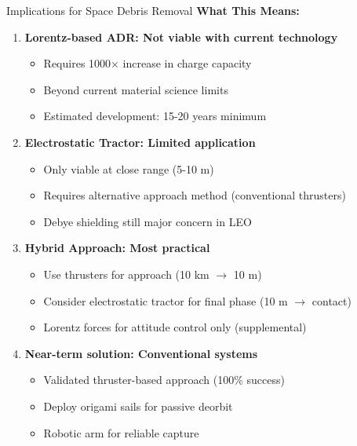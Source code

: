 \documentclass[aspectratio=169]{beamer}
\begin{document}
\begin{frame}{Implications for Space Debris Removal}
\textbf{What This Means:}

\begin{enumerate}
    \item \textbf{Lorentz-based ADR: Not viable with current technology}
    \begin{itemize}
        \item Requires 1000× increase in charge capacity
        \item Beyond current material science limits
        \item Estimated development: 15-20 years minimum
    \end{itemize}

    \vspace{0.2cm}
    \item \textbf{Electrostatic Tractor: Limited application}
    \begin{itemize}
        \item Only viable at close range (5-10 m)
        \item Requires alternative approach method (conventional thrusters)
        \item Debye shielding still major concern in LEO
    \end{itemize}

    \vspace{0.2cm}
    \item \textbf{Hybrid Approach: Most practical}
    \begin{itemize}
        \item Use thrusters for approach (10 km $\rightarrow$ 10 m)
        \item Consider electrostatic tractor for final phase (10 m $\rightarrow$ contact)
        \item Lorentz forces for attitude control only (supplemental)
    \end{itemize}

    \vspace{0.2cm}
    \item \textbf{Near-term solution: Conventional systems}
    \begin{itemize}
        \item Validated thruster-based approach (100\% success)
        \item Deploy origami sails for passive deorbit
        \item Robotic arm for reliable capture
    \end{itemize}
\end{enumerate}
\end{frame}
\end{document}
